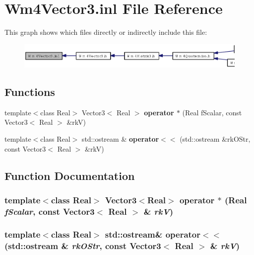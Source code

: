 \section{Wm4Vector3.inl File Reference}
\label{Wm4Vector3_8inl}


This graph shows which files directly or indirectly include this file:\begin{figure}[H]
\begin{center}
\leavevmode
\includegraphics[width=347pt]{Wm4Vector3_8inl__dep__incl}
\end{center}
\end{figure}
\subsection*{Functions}
\begin{CompactItemize}
\item 
template$<$class Real$>$ Vector3$<$ Real $>$ {\bf operator $\ast$} (Real f\-Scalar, const Vector3$<$ Real $>$ \&rk\-V)
\item 
template$<$class Real$>$ std::ostream \& {\bf operator$<$$<$} (std::ostream \&rk\-OStr, const Vector3$<$ Real $>$ \&rk\-V)
\end{CompactItemize}


\subsection{Function Documentation}
\subsubsection{\setlength{\rightskip}{0pt plus 5cm}template$<$class Real$>$ Vector3$<$Real$>$ operator $\ast$ (Real {\em f\-Scalar}, const Vector3$<$ Real $>$ \& {\em rk\-V})\hspace{0.3cm}{\tt  [inline]}}\label{Wm4Vector3_8inl_a4181a73ff21a2b062970298166810ff}


\subsubsection{\setlength{\rightskip}{0pt plus 5cm}template$<$class Real$>$ std::ostream\& operator$<$$<$ (std::ostream \& {\em rk\-OStr}, const Vector3$<$ Real $>$ \& {\em rk\-V})}\label{Wm4Vector3_8inl_1051ef6a7fa4075a8014680811d82c1c}


